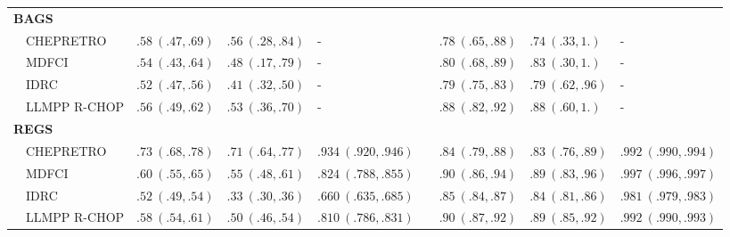 \begin{table}[!tbp]
{\begin{center}
\begin{tabular}{llllclll}
\hline
{\bfseries BAGS}&&&&&&&\tabularnewline
~~CHEPRETRO&$.58~(.47, .69)$&$.56~(.28, .84)$&-&&$.78~(.65, .88)$&$.74~(.33, 1.)$&-\tabularnewline
~~MDFCI&$.54~(.43, .64)$&$.48~(.17, .79)$&-&&$.80~(.68, .89)$&$.83~(.30, 1.)$&-\tabularnewline
~~IDRC&$.52~(.47, .56)$&$.41~(.32, .50)$&-&&$.79~(.75, .83)$&$.79~(.62, .96)$&-\tabularnewline
~~LLMPP R-CHOP&$.56~(.49, .62)$&$.53~(.36, .70)$&-&&$.88~(.82, .92)$&$.88~(.60, 1.)$&-\tabularnewline
\hline
{\bfseries REGS}&&&&&&&\tabularnewline
~~CHEPRETRO&$.73~(.68, .78)$&$.71~(.64, .77)$&$.934~(.920, .946)$&&$.84~(.79, .88)$&$.83~(.76, .89)$&$.992~(.990, .994)$\tabularnewline
~~MDFCI&$.60~(.55, .65)$&$.55~(.48, .61)$&$.824~(.788, .855)$&&$.90~(.86, .94)$&$.89~(.83, .96)$&$.997~(.996, .997)$\tabularnewline
~~IDRC&$.52~(.49, .54)$&$.33~(.30, .36)$&$.660~(.635, .685)$&&$.85~(.84, .87)$&$.84~(.81, .86)$&$.981~(.979, .983)$\tabularnewline
~~LLMPP R-CHOP&$.58~(.54, .61)$&$.50~(.46, .54)$&$.810~(.786, .831)$&&$.90~(.87, .92)$&$.89~(.85, .92)$&$.992~(.990, .993)$\tabularnewline
\hline
\end{tabular}\end{center}}

\end{table}
